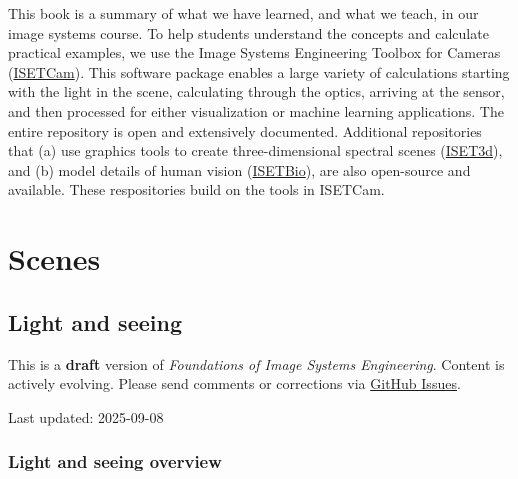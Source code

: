 \documentclass[
  letterpaper,
]{book}
\begin{document}
This book is a summary of what we have learned, and what we teach, in
our image systems course. To help students understand the concepts and
calculate practical examples, we use the Image Systems Engineering
Toolbox for Cameras
(\href{https://github.com/iset/isetcam/wiki}{ISETCam}). This software
package enables a large variety of calculations starting with the light
in the scene, calculating through the optics, arriving at the sensor,
and then processed for either visualization or machine learning
applications. The entire repository is open and extensively documented.
Additional repositories that (a) use graphics tools to create
three-dimensional spectral scenes
(\href{https://github.com/iset/iset3d-tiny/wiki}{ISET3d}), and (b) model
details of human vision
(\href{https://github.com/isetbio/isetbio/wiki}{ISETBio}), are also
open-source and available. These respositories build on the tools in
ISETCam.

\part{Scenes}

\chapter{Light and seeing}\label{sec-light}

\begin{tcolorbox}[enhanced jigsaw, opacityback=0, breakable, coltitle=black, leftrule=.75mm, left=2mm, colframe=quarto-callout-warning-color-frame, opacitybacktitle=0.6, bottomtitle=1mm, bottomrule=.15mm, toprule=.15mm, title=\textcolor{quarto-callout-warning-color}{\faExclamationTriangle}\hspace{0.5em}{Work in Progress}, titlerule=0mm, toptitle=1mm, colback=white, rightrule=.15mm, colbacktitle=quarto-callout-warning-color!10!white, arc=.35mm]

This is a \textbf{draft} version of \emph{Foundations of Image Systems
Engineering}. Content is actively evolving. Please send comments or
corrections via \href{https://github.com/wandell/FISE-git/issues}{GitHub
Issues}.

Last updated: 2025-09-08

\end{tcolorbox}

\section{Light and seeing overview}\label{sec-light-overview}
\end{document}
